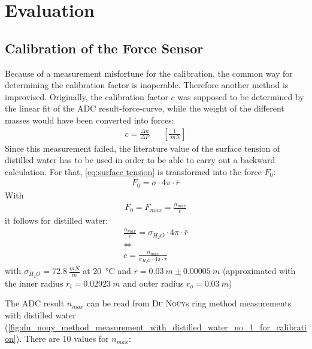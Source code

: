 \chapter{Evaluation}
    \section{Calibration of the Force Sensor}
        Because of a measurement misfortune for the calibration, the common way for determining the calibration factor is inoperable. Therefore another method is improvised. Originally, the calibration factor $ c $ was supposed to be determined by the linear fit of the ADC result-force-curve, while the weight of the different masses would have been converted into forces:
        \begin{align}
            c=\frac{\Delta n}{\Delta F} &&\left[\frac{1}{\SI{}{mN}}\right]
        \end{align}
        Since this measurement failed, the literature value of the surface tension of distilled water has to be used in order to be able to carry out a backward calculation. For that, \cref{eq:surface tension} is transformed into the force $ F_0 $:
        \begin{align*}
            F_0=\sigma \cdot 4\pi \cdot \bar{r}
        \end{align*}
        With
        \begin{align}
            F_0=F_{max}=\frac{n_{max}}{c}
            \label{eq:force}
        \end{align}
        it follows for distilled water:
        \begin{gather}
            \frac{n_{max}}{c} = \sigma_{H_2O} \cdot 4\pi \cdot \bar{r} \nonumber \\
            \Leftrightarrow \nonumber \\
            c = \frac{n_{max}}{\sigma_{H_2O} \cdot 4\pi \cdot \bar{r}}
            \label{eq:calibration factor}
        \end{gather}
        with \(\sigma_{H_2O}=\SI{72.8}{\frac{mN}{m}}\) at \SI{20}{\celsius} \cite{Eichler.2016} and \(\bar{r} = \SI{0.03}{m} \pm \SI{0.00005}{m}\)
        (approximated with the inner radius $ r_i=\SI{0.02923}{m} $ and outer radius $ r_o=\SI{0.03}{m} $)\par\medskip
        The ADC result \(n_{max}\) can be read from \textsc{Du Noüy}s ring method measurements with distilled water (\cref{fig:du_nouy_method_measurement_with_distilled_water_no_1_for_calibration}).
        There are 10 values for \(n_{max}\):
